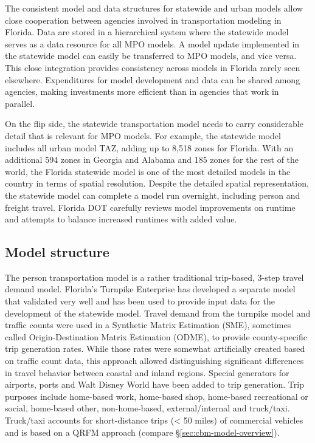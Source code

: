 The consistent model and data structures for statewide and urban models allow close cooperation between agencies involved in transportation modeling in Florida. Data are stored in a hierarchical system where the statewide model serves as a data resource for all MPO models. A model update implemented in the statewide model can easily be transferred to MPO models, and vice versa. This close integration provides consistency across models in Florida rarely seen elsewhere. Expenditures for model development and data can be shared among agencies, making investments more efficient than in agencies that work in parallel.

On the flip side, the statewide transportation model needs to carry considerable detail that is relevant for MPO models. For example, the statewide model includes all urban model TAZ, adding up to 8,518 zones for Florida. With an additional 594 zones in Georgia and Alabama and 185 zones for the rest of the world, the Florida statewide model is one of the most detailed models in the country in terms of spatial resolution. Despite the detailed spatial representation, the statewide model can complete a model run overnight, including person and freight travel. Florida DOT carefully reviews model improvements on runtime and attempts to balance increased runtimes with added value.

\subsection{Model structure}

The person transportation model is a rather traditional trip-based, 3-step travel demand model. Florida's Turnpike Enterprise has developed a separate model that validated very well and has been used to provide input data for the development of the statewide model. Travel demand from the turnpike model and traffic counts were used in a Synthetic Matrix Estimation (SME), sometimes called Origin-Destination Matrix Estimation (ODME), to provide county-specific trip generation rates. While those rates were somewhat artificially created based on traffic count data, this approach allowed distinguishing significant differences in travel behavior between coastal and inland regions. Special generators for airports, ports and Walt Disney World have been added to trip generation. Trip purposes include home-based work, home-based shop, home-based recreational or social, home-based other, non-home-based, external/internal and truck/taxi. Truck/taxi accounts for short-distance trips (\textless{} 50 miles) of commercial vehicles and is based on a QRFM approach (compare \S\ref{sec:cbm-model-overview}).

